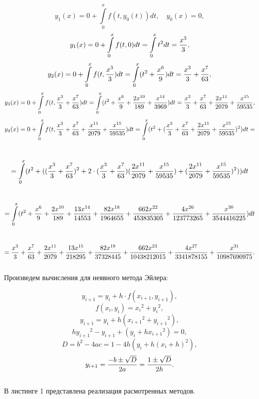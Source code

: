 \documentclass[a4paper, 14pt]{article}
\begin{document}
$$y_1(x) = 0 + \int\limits_0^x f(t, y_0(t))dt, \quad y_0(x) = 0,$$ 
$$y_1(x) = 0 + \int\limits_0^x f(t, 0)dt = \int\limits_0^x t^2 dt = {{x^3} \over {3}},$$ 
$$y_2(x) = 0 + \int\limits_0^x f(t, {{x^3} \over {3}})dt = \int\limits_0^x (t^2 + {{x^6} \over {9}})dt = {{x^3} \over {3}} + {{x^7} \over {63}},$$ 
$$y_3(x) = 0 + \int\limits_0^x f(t, {{x^3} \over {3}} + {{x^7} \over {63}})dt = \int\limits_0^x (t^2 + {{x^6} \over {9}} + {{2 x^{10}} \over {189}} + {{x^{14}} \over {3969}})dt = {{x^3} \over {3}} + {{x^7} \over {63}} + {{2x^{11}} \over {2079}} +  {{x^{15}} \over {59535}},$$ 
$$y_4(x) = 0 + \int\limits_0^x f(t, {{x^3} \over {3}} + {{x^7} \over {63}} + {{x^{11}} \over {2079}} +  {{x^{15}} \over {59535}})dt = \int\limits_0^x (t^2 + ({{x^3} \over {3}} + {{x^7} \over {63}} + {{2x^{11}} \over {2079}} +  {{x^{15}} \over {59535}})^2)dt =$$ \\ $$= \int\limits_0^x (t^2 + (({{x^3} \over {3}} + {{x^7} \over {63}} )^2 + 
2\cdot ({{x^3} \over {3}} + {{x^7} \over {63}})({{2x^{11}} \over {2079}} + {{x^{15}} \over {59535}}) + ({{2 x^{11}} \over {2079}} + {{x^{15}} \over {59535}})^2))dt$$\\ 
$$=\int\limits_0^x (t^2 + {{x^6} \over {9}} + {{2x^{10}} \over {189}} + {{13x^{14}} \over {14553}} + {{82x^{18}} \over {1964655}} + {{662x^{22}} \over {453835305}} +
{{4x^{26}} \over {123773265}} + {{x^{30}} \over {3544416225}})dt$$ \\
$$= {{x^3} \over {3}}+ {{x^7} \over {63}} + {{2x^{11}} \over {2079}} + {{13x^{15}} \over {218295}} + {{82x^{19}} \over {37328445}} + {{662x^{23}} \over {10438212015}} +
{{4x^{27}} \over {3341878155}} + {{x^{31}} \over {10987690975}}.$$ \\

Произведем вычисления для неявного метода Эйлера:
	
$$y_{i+1} = y_{i} + h \cdot f(x_{i+1}, y_{i+1}),$$
$$f(x_i, y_i) = {x_i}^2 + {y_i}^2,$$
$$y_{i+1} = y_i + h({x_{i+1}}^2 + {y_{i+1}}^2),$$
$$h{y_{i+1}}^2 - {y_{i+1}} + (y_i + h{x_{i+1}}^2) = 0,$$
$$D = b^2 - 4ac = 1 - 4h(y_i + h(x_i+h)^2),$$
$$y_{i+1} = {{-b \pm \sqrt D} \over {2a}} = {{1 \pm \sqrt D} \over {2h}}.$$\\

	В листинге 1 представлена реализация расмотренных методов.
	
\end{document}
